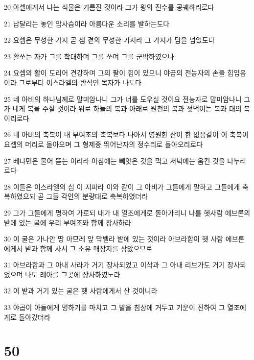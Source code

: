 \par 20 아셀에게서 나는 식물은 기름진 것이라 그가 왕의 진수를 공궤하리로다
\par 21 납달리는 놓인 암사슴이라 아름다운 소리를 발하는도다
\par 22 요셉은 무성한 가지 곧 샘 곁의 무성한 가지라 그 가지가 담을 넘었도다
\par 23 활쏘는 자가 그를 학대하며 그를 쏘며 그를 군박하였으나
\par 24 요셉의 활이 도리어 견강하며 그의 팔이 힘이 있으니 야곱의 전능자의 손을 힘입음이라 그로부터 이스라엘의 반석인 목자가 나도다
\par 25 네 아비의 하나님께로 말미암나니 그가 너를 도우실 것이요 전능자로 말미암나니 그가 네게 복을 주실 것이라 위로 하늘의 복과 아래로 원천의 복과 젖먹이는 복과 태의 복이리로다
\par 26 네 아비의 축복이 내 부여조의 축복보다 나아서 영원한 산이 한 없음같이 이 축복이 요셉의 머리로 돌아오며 그 형제중 뛰어난자의 정수리로 돌아오리로다
\par 27 베냐민은 물어 뜯는 이리라 아침에는 빼앗은 것을 먹고 저녁에는 움킨 것을 나누리로다
\par 28 이들은 이스라엘의 십 이 지파라 이와 같이 그 아비가 그들에게 말하고 그들에게 축복하였으되 곧 그들 각인의 분량대로 축복하였더라
\par 29 그가 그들에게 명하여 가로되 내가 내 열조에게로 돌아가리니 나를 헷사람 에브론의 밭에 있는 굴에 우리 부여조와 함께 장사하라
\par 30 이 굴은 가나안 땅 마므레 앞 막벨라 밭에 있는 것이라 아브라함이 헷 사람 에브론에게서 밭과 함께 사서 그 소유 매장지를 삼았으므로
\par 31 아브라함과 그 아내 사라가 거기 장사되었고 이삭과 그 아내 리브가도 거기 장사되었으며 나도 레아를 그곳에 장사하였노라
\par 32 이 밭과 거기 있는 굴은 헷 사람에게서 산 것이니라
\par 33 야곱이 아들에게 명하기를 마치고 그 발을 침상에 거두고 기운이 진하여 그 열조에게로 돌아갔더라

\chapter{50}

